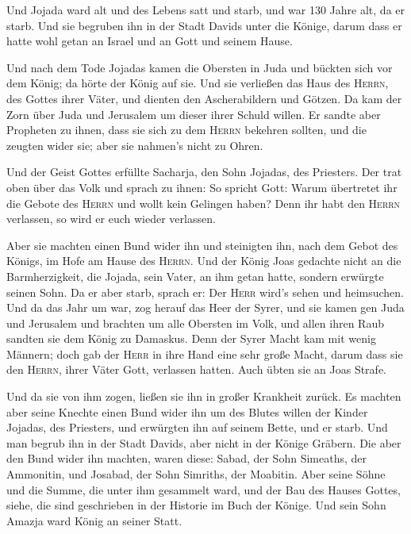  Und Jojada ward alt und des Lebens satt und starb, und
war 130 Jahre alt, da er starb.  Und sie begruben ihn in
der Stadt Davids unter die Könige, darum dass er hatte wohl getan an
Israel und an Gott und seinem Hause.

 Und nach dem Tode Jojadas kamen die Obersten in Juda und
bückten sich vor dem König; da hörte der König auf sie. 
Und sie verließen das Haus des \textsc{Herrn}, des Gottes ihrer Väter,
und dienten den Ascherabildern und Götzen. Da kam der Zorn über Juda und
Jerusalem um dieser ihrer Schuld willen.  Er sandte aber
Propheten zu ihnen, dass sie sich zu dem \textsc{Herrn} bekehren
sollten, und die zeugten wider sie; aber sie nahmen's nicht zu Ohren.

 Und der Geist Gottes erfüllte Sacharja, den Sohn
Jojadas, des Priesters. Der trat oben über das Volk und sprach zu ihnen:
So spricht Gott: Warum übertretet ihr die Gebote des \textsc{Herrn} und
wollt kein Gelingen haben? Denn ihr habt den \textsc{Herrn} verlassen,
so wird er euch wieder verlassen.

 Aber sie machten einen Bund wider ihn und steinigten
ihn, nach dem Gebot des Königs, im Hofe am Hause des \textsc{Herrn}.
 Und der König Joas gedachte nicht an die Barmherzigkeit,
die Jojada, sein Vater, an ihm getan hatte, sondern erwürgte seinen
Sohn. Da er aber starb, sprach er: Der \textsc{Herr} wird's sehen und
heimsuchen.  Und da das Jahr um war, zog herauf das Heer
der Syrer, und sie kamen gen Juda und Jerusalem und brachten um alle
Obersten im Volk, und allen ihren Raub sandten sie dem König zu
Damaskus.  Denn der Syrer Macht kam mit wenig Männern;
doch gab der \textsc{Herr} in ihre Hand eine sehr große Macht, darum
dass sie den \textsc{Herrn}, ihrer Väter Gott, verlassen hatten. Auch
übten sie an Joas Strafe.

 Und da sie von ihm zogen, ließen sie ihn in großer
Krankheit zurück. Es machten aber seine Knechte einen Bund wider ihn um
des Blutes willen der Kinder Jojadas, des Priesters, und erwürgten ihn
auf seinem Bette, und er starb. Und man begrub ihn in der Stadt Davids,
aber nicht in der Könige Gräbern.  Die aber den Bund
wider ihn machten, waren diese: Sabad, der Sohn Simeaths, der Ammonitin,
und Josabad, der Sohn Simriths, der Moabitin.  Aber seine
Söhne und die Summe, die unter ihm gesammelt ward, und der Bau des
Hauses Gottes, siehe, die sind geschrieben in der Historie im Buch der
Könige. Und sein Sohn Amazja ward König an seiner Statt.

